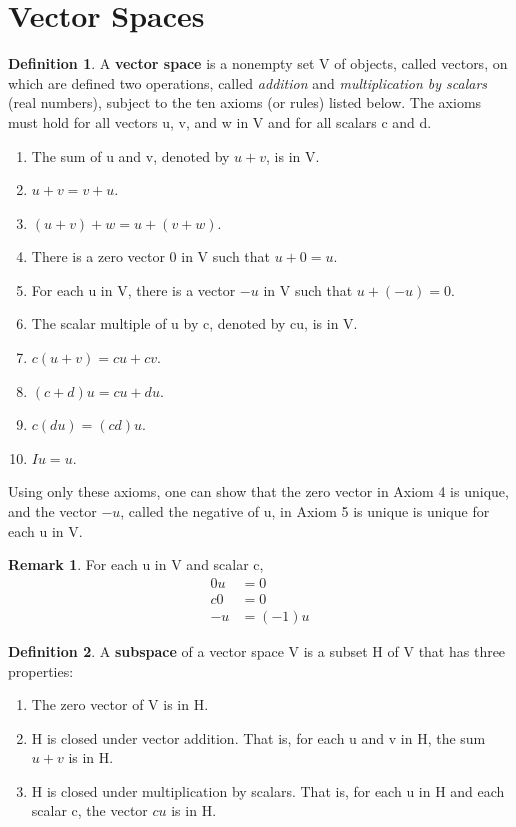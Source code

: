 \documentclass[12pt]{article}
\theoremstyle{definition}
\newtheorem{definition}{Definition} %
\newtheorem*{remark}{Remark}        %
\numberwithin{equation}{theorem}    %
\begin{document}
\section{Vector Spaces}

\begin{definition}
    A \textbf{vector space} is a nonempty set V of objects, called vectors, on which are defined two operations, called \emph{addition} and \emph{multiplication by scalars} (real numbers), subject to the ten axioms (or rules) listed below. The axioms must hold for all vectors u, v, and w in V and for all scalars c and d.
    \begin{enumerate}
        \item The sum of u and v, denoted by $u+v$, is in V.
        \item $u+v=v+u$.
        \item $(u+v)+w=u+(v+w)$.
        \item There is a zero vector 0 in V such that $u+0=u$.
        \item For each u in V, there is a vector $-u$ in V such that $u+(-u)=0$.
        \item The scalar multiple of u by c, denoted by cu, is in V.
        \item $c(u+v)=cu+cv$.
        \item $(c+d)u=cu+du$.
        \item $c(du)=(cd)u$.
        \item $Iu=u$.
    \end{enumerate}
    Using only these axioms, one can show that the zero vector in Axiom 4 is unique, and the vector $-u$, called the negative of u, in Axiom 5 is unique is unique for each u in V.
    \begin{remark}
        For each u in V and scalar c,
        \begin{align}
            0u & = 0     \\
            c0 & = 0     \\
            -u & = (-1)u
        \end{align}
    \end{remark}
\end{definition}

\begin{definition}
    A \textbf{subspace} of a vector space V is a subset H of V that has three properties:
    \begin{enumerate}
        \item The zero vector of V is in H.
        \item H is closed under vector addition. That is, for each u and v in H, the sum $u+v$ is in H.
        \item H is closed under multiplication by scalars. That is, for each u in H and each scalar c, the vector $cu$ is in H.
    \end{enumerate}
\end{definition}
\end{document}
